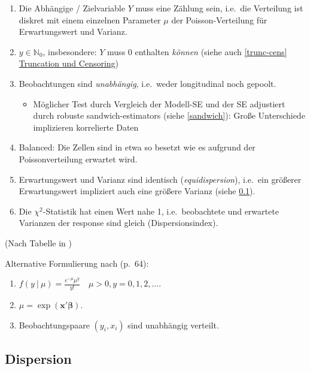 \documentclass[ngerman,a4paper,]{scrartcl}
\providecommand{\tightlist}{%
  \setlength{\itemsep}{0pt}\setlength{\parskip}{0pt}}
\theoremstyle{definition}
\theoremstyle{definition}
\theoremstyle{definition}
\theoremstyle{remark}
\begin{document}
\begin{enumerate}
\def\labelenumi{\arabic{enumi}.}
\tightlist
\item
  Die Abhängige / Zielvariable \(Y\) muss eine Zählung sein, i.e.~die Verteilung ist diskret mit einem einzelnen Parameter \(\mu\) der Poisson-Verteilung für Erwartungswert und Varianz.
\item
  \(y \in \mathbb{N}_0\), insbesondere: \(Y\) muss 0 enthalten \emph{können} (siehe auch \ref{trunc-cens} \protect\hyperlink{trunc-cens}{Truncation und Censoring})
\item
  Beobachtungen sind \emph{unabhängig}, i.e.~weder longitudinal noch gepoolt.

  \begin{itemize}
  \tightlist
  \item
    Möglicher Test durch Vergleich der Modell-SE und der SE adjustiert durch robuste sandwich-estimators (siehe \ref{sandwich}): Große Unterschiede implizieren korrelierte Daten
  \end{itemize}
\item
  Balanced: Die Zellen sind in etwa so besetzt wie es aufgrund der Poissonverteilung erwartet wird.
\item
  Erwartungswert und Varianz sind identisch (\emph{equidispersion}), i.e.~ein größerer Erwartungswert impliziert auch eine größere Varianz (siehe \ref{dispersion}).
\item
  Die \(\chi^2\)-Statistik hat einen Wert nahe 1, i.e.~beobachtete und erwartete Varianzen der response sind gleich (Dispersionsindex).
\end{enumerate}

(Nach Tabelle in \citep{hilbeModelingCountData2014})

Alternative Formulierung nach \citet{winkelmannEconometricAnalysisCount2010} (p.~64):

\begin{enumerate}
\def\labelenumi{\arabic{enumi}.}
\tightlist
\item
  \(f(y\ |\ \mu) = \frac{e^{-\mu} \mu^y}{y!} \quad \mu > 0, y = 0, 1, 2, \ldots\).
\item
  \(\mu = \exp(\mathbf{x}' \boldsymbol{\beta})\).
\item
  Beobachtungspaare \((y_i, x_i)\) sind unabhängig verteilt.
\end{enumerate}

\hypertarget{dispersion}{%
\subsection{Dispersion}\label{dispersion}}
\end{document}
